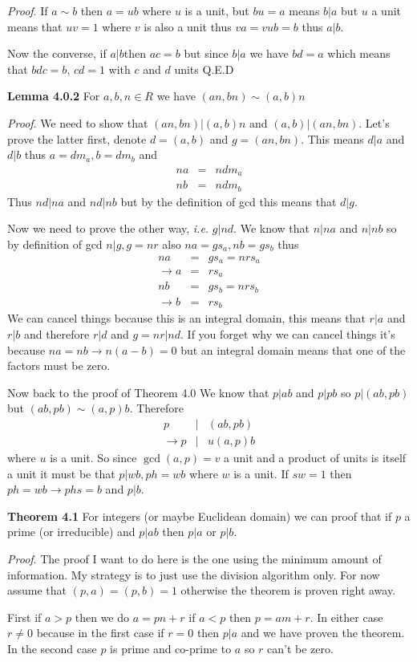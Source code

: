 \documentclass[aps,preprint,preprintnumbers,nofootinbib,showpacs,prd]{revtex4-1}
\newcommand{\ie}{{\it i.e.} }
\newcommand{\nbea}{\begin{eqnarray*}}
\newcommand{\neea}{\end{eqnarray*}}
\begin{document}
{\it Proof}. If $a \sim b$ then $a = ub$ where $u$ is a unit, but $bu = a$ means $b|a$ but $u$ a unit means that $uv = 1$ where $v$ is also a unit thus $va = vub = b$ thus $a|b$.

Now the converse, if $a|b$then $ac = b$ but since $b|a$ we have $bd = a$ which means that $bdc = b$, $cd = 1$ with $c$ and $d$ units Q.E.D

{\bf Lemma 4.0.2} For $a,b,n \in R$ we have $(an, bn) \sim (a,b) n$ 

{\it Proof}. We need to show that $(an,bn) | (a,b)n$ and $(a,b)|(an,bn)$. Let's prove the latter first, denote $d = (a,b)$ and $g = (an,bn)$. This means $d|a$ and $d|b$ thus $a = d m_a, b = dm_b$ and
%
\nbea
na & = & n dm_a \\
nb & = & nd m_b
\neea
%
Thus $nd|na$ and $nd | nb$ but by the definition of gcd this means that $d|g$.

Now we need to prove the other way, \ie $g|nd$. We know that $n|na$ and $n|nb$ so by definition of gcd $n|g, g = nr$ also $na = gs_a, nb = gs_b$ thus
%
\nbea
na & = & g s_a = nrs_a \\
\to a & = & rs_a \\
nb & = & g s_b = nr s_b \\
\to b & = & r s_b
\neea
% 
We can cancel things because this is an integral domain, this means that $r|a$ and $r|b$ and therefore $r|d$ and $g = nr | nd$. If you forget why we can cancel things it's because $na = nb \to n(a-b) = 0$ but an integral domain means that one of the factors must be zero.


Now back to the proof of Theorem 4.0 We know that $p|ab$ and $p|pb$ so $p|(ab,pb)$but $(ab,pb) \sim (a,p)b$. Therefore
%
\nbea
p &|& (ab, pb) \\
\to p & | & u (a,p) b
\neea
%
where $u$ is a unit. So since $\gcd(a,p) = v$ a unit and a product of units is itself a unit it must be that $p|wb, ph = wb$ where $w$ is a unit. If $sw = 1$ then $ph = wb \to phs = b$ and $p|b$.




{\bf Theorem 4.1} For integers (or maybe Euclidean domain) we can proof that if $p$ a prime (or irreducible) and $p|ab$ then $p|a$ or $p|b$.

{\it Proof}. The proof I want to do here is the one using the minimum amount of information. My strategy is to just use the division algorithm only. For now assume that $(p,a) = (p,b) = 1$ otherwise the theorem is proven right away.

First if $a > p$ then we do $a = pn + r$ if $a< p$ then $p = am + r$. In either case $r \neq 0$ because in the first case if $r = 0$ then $p|a$ and we have proven the theorem. In the second case $p$ is prime and co-prime to $a$ so $r$ can't be zero.
\end{document}
